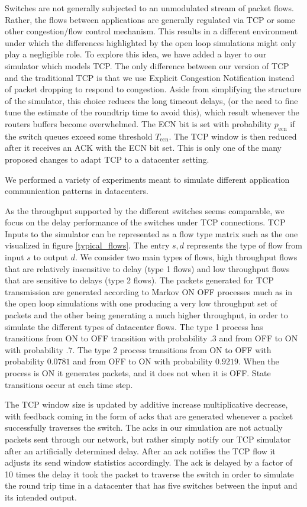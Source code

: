 \documentclass{IEEEtran}%
\begin{document}
Switches are not generally subjected to an unmodulated stream of packet flows.  Rather, the flows between applications are generally regulated via TCP or some other congestion/flow control mechanism.  This results in a different environment under which the differences highlighted by the open loop simulations might only play a negligible role.  To explore this idea, we have added a layer to our simulator which models TCP.  The only difference between our version of TCP and the traditional TCP is that we use Explicit Congestion Notification instead of packet dropping to respond to congestion.  Aside from simplifying the structure of the simulator, this choice reduces the long timeout delays, (or the need to fine tune the estimate of the roundtrip time to avoid this), which result whenever the routers buffers become overwhelmed.  The ECN bit is set with probability $p_{\text{ecn}}$ if the switch queues exceed some threshold $T_{\text{ecn}}$.  The TCP window is then reduced after it receives an ACK with the ECN bit set.  This is only one of the many proposed changes to adapt TCP to a datacenter setting.

We performed a variety of experiments meant to simulate different application communication patterns in datacenters.

As the throughput supported by the different switches seems comparable, we focus on the delay performance of the switches under TCP connections.  TCP Inputs to the simulator can be represented as a flow type matrix such as the one visualized in figure \ref{typical_flows}.  The entry $s,d$ represents the type of flow from input $s$ to output $d$.  We consider two main types of flows, high throughput flows that are relatively insensitive to delay (type 1 flows) and low throughput flows that are sensitive to delays (type 2 flows).  The packets generated for TCP transmission are generated according to Markov ON OFF processes much as in the open loop simulations with one producing a very low throughput set of packets and the other being generating a much higher throughput, in order to simulate the different types of datacenter flows.  The type 1 process has transitions from ON to OFF transition with probability $.3$ and from OFF to ON with probability $.7$.  The type 2 process transitions from ON to OFF with probability $0.0781$ and from OFF to ON with probability $0.9219$.  When the process is ON it generates packets, and it does not when it is OFF.   State transitions occur at each time step.

The TCP window size is updated by additive increase multiplicative decrease, with feedback coming in the form of acks that are generated whenever a packet successfully traverses the switch.  The acks in our simulation are not actually packets sent through our network, but rather simply notify our TCP simulator after an artificially determined delay.  After an ack notifies the TCP flow it adjusts its send window statistics accordingly.  The ack is delayed by a factor of 10 times the delay it took the packet to traverse the switch in order to simulate the round trip time in a datacenter that has five switches between the input and its intended output.
\end{document}
